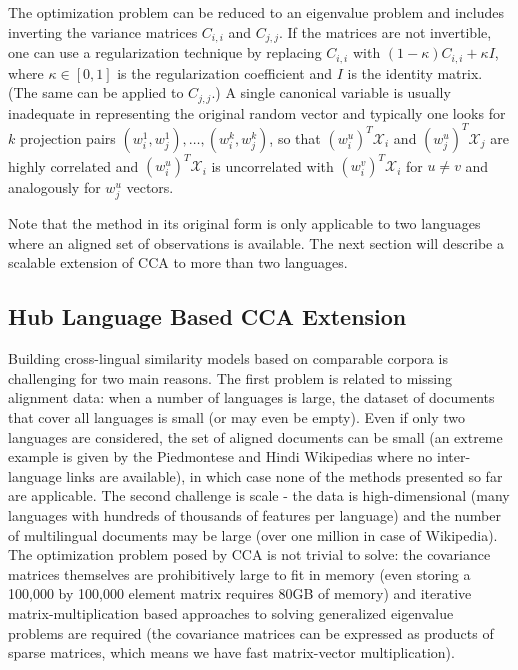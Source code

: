 \documentclass[twoside,11pt]{article}
\begin{document}
The optimization problem can be reduced to an eigenvalue problem and includes inverting the variance matrices $C_{i,i}$ and $C_{j,j}$. If the matrices are not invertible, one can use a regularization technique by replacing $C_{i,i}$ with $(1- \kappa)C_{i,i} + \kappa I$, where $\kappa \in [0,1]$ is the regularization coefficient and $I$ is the identity matrix. (The same can be applied to $C_{j,j}$.)
A single canonical variable is usually inadequate in representing the original random vector and typically one looks for $k$ projection pairs $(w_i^1, w_j^1),\ldots,(w_i^k, w_j^k)$, so that $(w_i^{u})^T \mathcal{X}_i$ and $(w_j^{u})^T \mathcal{X}_j$ are highly correlated and $(w_i^{u})^T \mathcal{X}_i$ is uncorrelated with $(w_i^{v})^T \mathcal{X}_i$  for $u \neq v$ and analogously for $w_j^u$ vectors.

Note that the method in its original form is only applicable to two languages where an aligned set of observations is available. The next section will describe a scalable extension of CCA to more than two languages.

\subsection{Hub Language Based CCA Extension}\label{sec:hublang}
Building cross-lingual similarity models based on comparable corpora is challenging for two main reasons. The first problem is related to missing alignment data: when a number of languages is large, the dataset of documents that cover all languages is small (or may even be empty). Even if only two languages are considered, the set of aligned documents can be small (an extreme example is given by the Piedmontese and Hindi Wikipedias where no inter-language links are available), in which case none of the methods presented so far are applicable.
 The second challenge is scale - the data is high-dimensional (many languages with hundreds of thousands of features per language) and the number of multilingual documents may be large (over one million in case of Wikipedia). The optimization problem posed by CCA is not
 trivial to solve: the covariance matrices themselves are prohibitively large to fit in memory (even storing a 100,000 by 100,000 element matrix requires 80GB of memory) and iterative matrix-multiplication based approaches to  solving generalized eigenvalue problems are required (the covariance matrices can be expressed as products of sparse matrices, which means we have fast matrix-vector multiplication).
\end{document}
